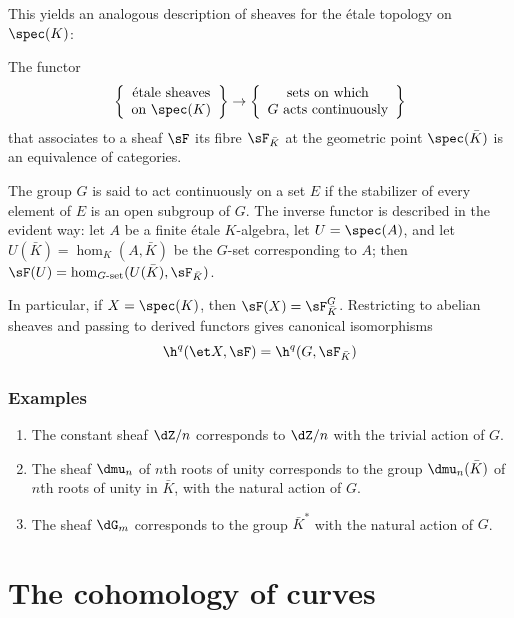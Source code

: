 This yields an analogous description of sheaves for the étale topology on
$\spec(K)$:

\begin{proposition}\label{I:2-4-4}
The functor
\[
  \left\{\begin{array}{c}
          \textnormal{étale sheaves} \\
          \textnormal{on $\spec(K)$}
        \end{array}\right\}
  \to
  \left\{\begin{array}{c}
          \textnormal{sets on which} \\
          \textnormal{$G$ acts continuously}
        \end{array}\right\}
\]
that associates to a sheaf $\sF$ its fibre $\sF_{\bar K}$ at the
geometric point $\spec(\bar K)$ is an equivalence of categories.
\end{proposition}

The group $G$ is said to act continuously on a set $E$ if the stabilizer
of every element of $E$ is an open subgroup of $G$. The inverse functor
is described in the evident way: let $A$ be a finite étale
$K$-algebra, let $U=\spec(A)$, and let
$U(\bar K)=\hom_K(A,\bar K)$ be the $G$-set corresponding to $A$; then
$\sF(U)=\hom_{G\text{-set}}(U(\bar K),\sF_{\bar K})$.

In particular, if $X=\spec(K)$, then $\sF(X)=\sF_{\bar K}^G$. Restricting
to abelian sheaves and passing to derived functors gives canonical
isomorphisms
\[
  \h^q(\et X,\sF) = \h^q(G,\sF_{\bar K})
\]

\subsubsection{Examples}\label{I:2-4-5}

\begin{enumerate}[\indent a)]
  \item The constant sheaf $\dZ/n$ corresponds to $\dZ/n$ with the
    trivial action of $G$.
  \item The sheaf $\dmu_n$ of $n$th roots of unity corresponds to the
    group $\dmu_n(\bar K)$ of $n$th roots of unity in $\bar K$, with
    the natural action of $G$.
  \item The sheaf $\dG_m$ corresponds to the group $\bar K^*$ with
    the natural action of $G$.
\end{enumerate}

\section{The cohomology of curves}\label{I:3}

